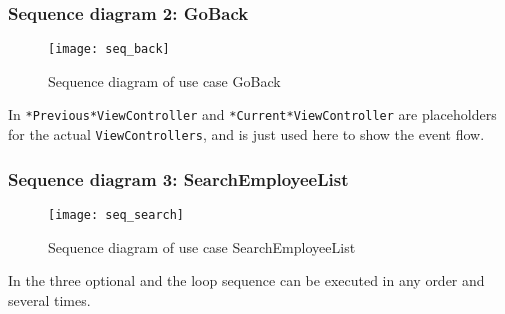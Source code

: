 \subsubsection{Sequence diagram 2: GoBack}

\begin{figure}[H]
    \centerline{\texttt{[image: seq\_back]}}
    \caption{Sequence diagram of use case GoBack }
    \label{fig:uc2}
\end{figure}

In  \texttt{*Previous*ViewController} and \texttt{*Current*ViewController} are placeholders for the actual \texttt{ViewControllers}, and is just used here to show the event flow.

\newpage
\subsubsection{Sequence diagram 3: SearchEmployeeList}

\begin{figure}[H]
    \centerline{\texttt{[image: seq\_search]}}
    \caption{Sequence diagram of use case SearchEmployeeList}
    \label{fig:uc3}
\end{figure}

In  the three optional and the loop sequence can be executed in any order and several times.
